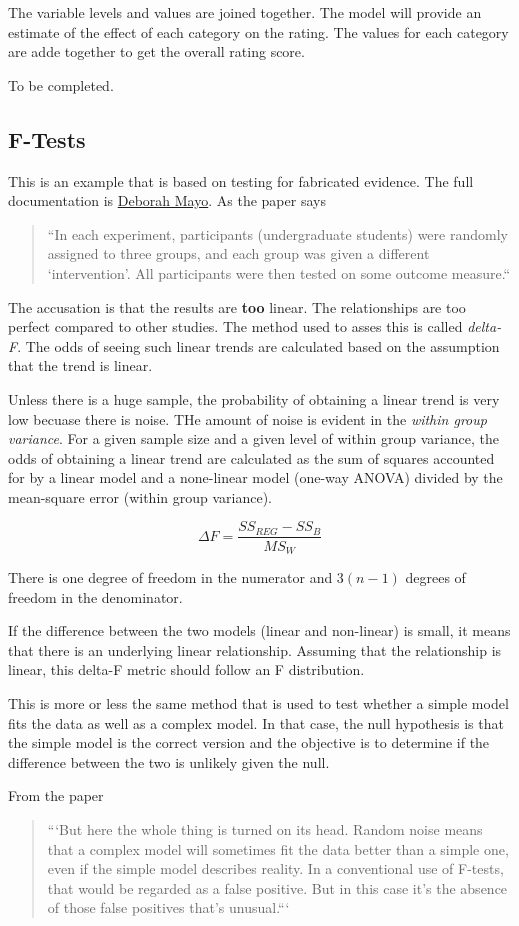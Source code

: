 \documentclass[12pt, a4paper, oneside]{article}\usepackage[]{graphicx}\usepackage[]{color}
\begin{document}
The variable levels and values are joined together. The model will provide an estimate of the effect of each category on the rating.  The values for each category are adde together to get the overall rating score. 

To be completed. 

\subsection{F-Tests}
This is an example that is based on testing for fabricated evidence.  The full documentation is \href{http://errorstatistics.com/2014/05/10/who-ya-gonna-call-for-statistical-fraudbusting-r-a-fisher-p-values-and-error-statistics-again/}{Deborah Mayo}.  As the paper says
\begin{quotation}
``In each experiment, participants (undergraduate students) were randomly assigned to three groups, and each group was given a different ‘intervention’. All participants were then tested on some outcome measure.``
\end{quotation}
The accusation is that the results are \textbf{too} linear.  The relationships are too perfect compared to other studies.  The method used to asses this is called \emph{delta-F}.  The odds of seeing such linear trends are calculated based on the assumption that the trend is linear.  

Unless there is a huge sample, the probability of obtaining a linear trend is very low becuase there is noise. THe amount of noise is evident in the \emph{within group variance}.  For a given sample size and a given level of within group variance, the odds of obtaining a linear trend are calculated as the sum of squares accounted for by a linear model and a none-linear model (one-way ANOVA) divided by the mean-square error (within group variance).

\begin{equation}
\Delta F = \frac{SS_{REG} - SS_B}{MS_W}
\end{equation}

There is one degree of freedom in the numerator and $3(n-1)$ degrees of freedom in the denominator. 

If the difference between the two models (linear and non-linear) is small, it means that there is an underlying linear relationship. Assuming that the relationship is linear, this delta-F metric should follow an F distribution. 

This is more or less the same method that is used to test whether a simple model fits the data as well as a complex model. In that case, the null hypothesis is that the simple model is the correct version and the objective is to determine if the difference between the two is unlikely given the null. 

From the paper

\begin{quotation}
```But here the whole thing is turned on its head. Random noise means that a complex model will sometimes fit the data better than a simple one, even if the simple model describes reality. In a conventional use of F-tests, that would be regarded as a false positive. But in this case it’s the absence of those false positives that’s unusual.```
\end{quotation}
\end{document}
